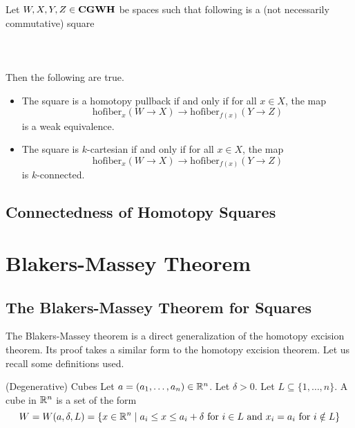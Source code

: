 \documentclass[a4paper]{article}
\begin{document}
\begin{prp}{}{} Let $W,X,Y,Z\in\bold{CGWH}$ be spaces such that following is a (not necessarily commutative) square \\~\\
\\~\\
Then the following are true. 
\begin{itemize}
\item The square is a homotopy pullback if and only if for all $x\in X$, the map $$\text{hofiber}_x(W\to X)\to\text{hofiber}_{f(x)}(Y\to Z)$$ is a weak equivalence. 
\item The square is $k$-cartesian if and only if for all $x\in X$, the map $$\text{hofiber}_x(W\to X)\to\text{hofiber}_{f(x)}(Y\to Z)$$ is $k$-connected. 
\end{itemize}
\end{prp}

\subsection{Connectedness of Homotopy Squares}

\pagebreak
\section{Blakers-Massey Theorem}
\subsection{The Blakers-Massey Theorem for Squares}
The Blakers-Massey theorem is a direct generalization of the homotopy excision theorem. Its proof takes a similar form to the homotopy excision theorem. Let us recall some definitions used. 

\begin{defn}{(Degenerative) Cubes}{} Let $a=(a_1,\dots,a_n)\in\mathbb{R}^n$. Let $\delta>0$. Let $L\subseteq\{1,\dots,n\}$. A cube in $\mathbb{R}^n$ is a set of the form $$W=W(a,\delta,L)=\{x\in\mathbb{R}^n\;|\;a_i\leq x\leq a_i+\delta\text{ for }i\in L\text{ and }x_i=a_i\text{ for }i\notin L\}$$
\end{defn}
\end{document}
